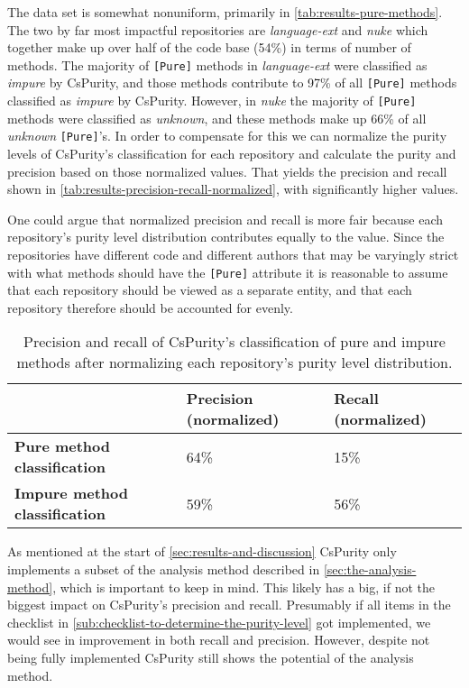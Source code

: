 \documentclass[a4paper,12pt]{article}
\begin{document}
The data set is somewhat nonuniform, primarily in \autoref{tab:results-pure-methods}. The two by far most impactful repositories are \textit{language-ext} and \textit{nuke} which together make up over half of the code base (54\%) in terms of number of methods. The majority of \texttt{[Pure]} methods in \textit{language-ext} were classified as \textit{impure} by CsPurity, and those methods contribute to 97\% of all \texttt{[Pure]} methods classified as \textit{impure} by CsPurity. However, in \textit{nuke} the majority of \texttt{[Pure]} methods were classified as \textit{unknown}, and these methods make up 66\% of all \textit{unknown} \texttt{[Pure]}'s. In order to compensate for this we can normalize the purity levels of CsPurity's classification for each repository and calculate the purity and precision based on those normalized values. That yields the precision and recall shown in \autoref{tab:results-precision-recall-normalized}, with significantly higher values.

One could argue that normalized precision and recall is more fair because each repository's purity level distribution contributes equally to the value. %
Since the repositories have different code and different authors that may be varyingly strict with what methods should have the \texttt{[Pure]} attribute it is reasonable to assume that each repository should be viewed as a separate entity, and that each repository therefore should be accounted for evenly.

\begin{table}[H]
  \centering
  \caption{Precision and recall of CsPurity's classification of pure and impure methods after normalizing each repository's purity level distribution.}
  \label{tab:results-precision-recall-normalized}
  \begin{tabular}{|l|ll|}
    \hline
                                          & \textbf{Precision (normalized)} & \textbf{Recall (normalized)} \\
    \hline
    \textbf{Pure method classification}   & 64\%                            & 15\%                         \\
    \textbf{Impure method classification} & 59\%                            & 56\%                         \\
    \hline
  \end{tabular}
\end{table}

As mentioned at the start of \autoref{sec:results-and-discussion} CsPurity only implements a subset of the analysis method described in \autoref{sec:the-analysis-method}, which is important to keep in mind. This likely has a big, if not the biggest impact on CsPurity's precision and recall. Presumably if all items in the checklist in \autoref{sub:checklist-to-determine-the-purity-level} got implemented, we would see in improvement in both recall and precision. However, despite not being fully implemented CsPurity still shows the potential of the analysis method.
\end{document}
